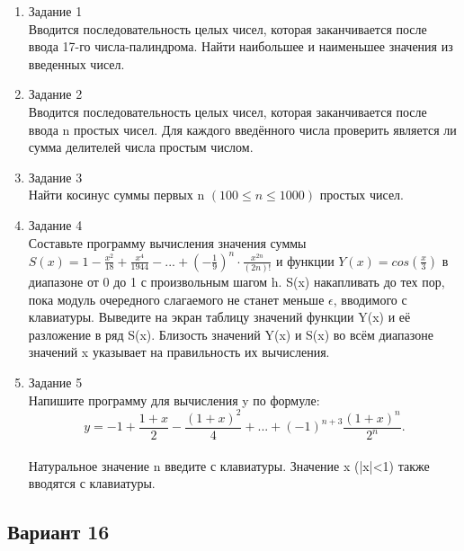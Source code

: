 \documentclass[a4paper]{article}
\begin{document}
	
	\begin{enumerate} 
		\item Задание 1 \\
		Вводится последовательность целых чисел, которая заканчивается после ввода 17-го числа-палиндрома. Найти наибольшее и наименьшее значения из введенных чисел.\\
		\item Задание 2\\
		Вводится последовательность целых чисел, которая заканчивается после ввода n простых чисел. Для каждого введённого числа проверить является ли сумма делителей числа простым числом.\\
		\item Задание 3 \\
		Найти  косинус суммы первых n $(100 \le n \le 1000) $ простых чисел.\\
		\item Задание 4 \\ 
		Составьте программу вычисления значения суммы  $S(x)=1-\frac{x^2}{18}+\frac{x^4}{1944}-...+(-\frac{1}{9})^n\cdot\frac{x^{2n}}{(2n)!}$
		и функции $Y(x)=cos(\frac{x}{3})$ в диапазоне от 0 до 1
		с произвольным шагом h.  S(x) накапливать до тех пор, пока модуль очередного слагаемого не станет меньше $\epsilon$, вводимого с клавиатуры. Выведите на экран таблицу значений функции Y(x) и её разложение в ряд S(x). Близость значений Y(x) и S(x) во всём диапазоне
		значений x указывает на правильность их вычисления.\\
		\item Задание 5 \\
		Напишите программу для вычисления y по формуле:\\
		$$y=-1+\frac{1+x}{2}-\frac{(1+x)^2}{4}+...+(-1)^{n+3}\frac{{(1+x)^n}}{2^n}.$$\\
		Натуральное значение n введите с клавиатуры. Значение x (|x|<1) также вводятся с клавиатуры.\\
		
	\end{enumerate}
	\newpage
	\begin{center}
		\subsection*{Вариант 16}
	\end{center}
	
\end{document}
